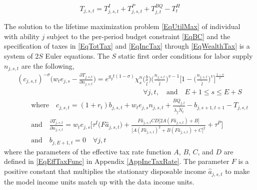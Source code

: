 \documentclass[letterpaper,12pt]{article}
\theoremstyle{definition}
\begin{document}
\begin{spacing}{1.5}
    \begin{equation} \label{EqTotTax}
      T_{j,s,t} = T^I_{j,s,t} + T^P_{j,s,t} + T^{BQ}_{j,t}  - T^H_{t}
    \end{equation}

    The solution to the lifetime maximization problem \eqref{EqUtilMax} of individual with ability $j$ subject to the per-period budget constraint \eqref{EqBC} and the specification of taxes in \eqref{EqTotTax} and \eqref{EqIncTax} through \eqref{EqWealthTax} is a system of $2S$ Euler equations. The $S$ static first order conditions for labor supply $n_{j,s,t}$ are the following,
    \begin{equation}\label{EqEulerLabGen}
      \begin{split}
        &(c_{j,s,t})^{-\sigma}\Biggl(w_t e_{j,s} - \frac{\partial T_{j,s,t}}{\partial n_{j,s,t}}\Biggr) = e^{g_y t(1-\sigma)}\chi^n_{s}\biggl(\frac{b}{\tilde{l}}\biggr)\biggl(\frac{n_{j,s,t}}{\tilde{l}}\biggr)^{v-1}\Biggl[1 - \biggl(\frac{n_{j,s,t}}{\tilde{l}}\biggr)^\upsilon\Biggr]^{\frac{1-v}{v}} \\
        &\qquad\qquad\qquad\qquad\qquad\qquad\qquad\qquad\qquad\forall j,t, \quad\text{and}\quad E+1\leq s\leq E+S \\
        &\qquad\text{where}\quad c_{j,s,t} = \left(1 + r_t\right) b_{j,s,t} + w_t e_{j,s}n_{j,s,t} + \frac{BQ_{j,t}}{\lambda_j\tilde{N}_t} - b_{j,s+1,t+1} - T_{j,s,t} \\
        &\qquad\text{and}\quad \frac{\partial T_{j,s,t}}{\partial n_{j,s,t}} = w_t e_{j,s}\biggl[\tau^I\bigl(F\hat{a}_{j,s,t}\bigr) + \frac{F\hat{a}_{j,s,t}CD\bigl[2A(F\hat{a}_{j,s,t})+B\bigr]}{\bigl[A(F\hat{a}_{j,s,t})^2+B(F \hat{a}_{j,s,t})+C\bigr]^2} + \tau^P\Biggr] \\
        &\qquad\text{and}\quad b_{j,E+1,t} = 0 \quad\forall j,t
      \end{split}
    \end{equation}
    where the parameters of the effective tax rate function $A$, $B$, $C$, and $D$ are defined in \eqref{EqEffTaxFunc} in Appendix \ref{AppIncTaxRate}. The parameter $F$ is a positive constant that multiplies the stationary disposable income $\hat{a}_{j,s,t}$ to make the model income units match up with the data income units.


\end{spacing}
\end{document}
